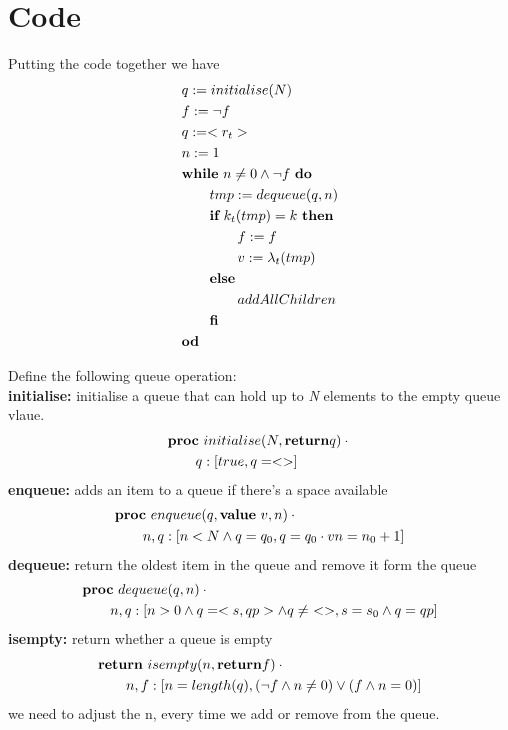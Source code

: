 \documentclass[headings=small,a4paper,12pt]{scrartcl}
\begin{document}
\section{Code}
\label{sec:code}
Putting the code together we have
\begin{align}
    &q\mathrel{:=} initialise(N)\\
    &f\mathrel{:=} \neg f\\
    &q\mathrel{:=} <r_t>\\
    &n\mathrel{:=} 1\\
    &\text{\normalfont\bfseries while}~n \ne 0\wedge \neg f~\text{\normalfont\bfseries do}\\
    &\qquad tmp\mathrel{:=} dequeue(q,n)\\
    &\qquad \text{\normalfont\bfseries if}~k_t(tmp) = k~\text{\normalfont\bfseries then}\\
    &\qquad\qquad f\mathrel{:=} f\\
    &\qquad\qquad v\mathrel{:=} \lambda_t(tmp)\\
    &\qquad \text{\normalfont\bfseries else}\\
    &\qquad\qquad addAllChildren\\
    &\qquad\text{\normalfont\bfseries fi}\\
    &\text{\normalfont\bfseries od}
\end{align}

Define the following queue operation:\\
\textbf{initialise:} initialise a queue that can hold up to \textit{N} elements to the empty queue vlaue.
\begin{align*}
  &\text{\normalfont\bfseries proc}~initialise(N,\text{\normalfont\bfseries return} q)\cdot{}\\
  &\qquad q :[true, q = <>]\\
\end{align*}
\break
\textbf{enqueue:} adds an item to a queue if there's a space available 
\begin{align*}
  &\text{\normalfont\bfseries proc}~enqueue(q, \text{\normalfont\bfseries value}~v,n)\cdot{}\\
    &\qquad n,q:[n<N \wedge q=q_0,q=q_0\cdot{}v n = n_0 + 1]\\
\end{align*}
%
\textbf{dequeue:} return the oldest item in the queue and remove it form the queue\\
\begin{align*}
    &\text{\normalfont\bfseries proc}~dequeue(q, n)\cdot{}\\
    &\qquad n,q:[n>0\wedge q=<s,qp>\wedge q\ne~<>, s= s_0\wedge q = qp] 
\end{align*}
\break
\textbf{isempty:} return whether a queue is empty
\begin{align*}
  &\text{\normalfont\bfseries return}~isempty(n, \text{\normalfont\bfseries return} f)\cdot{}\\
    &\qquad {n,f:[n = length(q) ,(\neg f \wedge n \neq 0)\vee(f \wedge n = 0)]}\\
\end{align*}
\break
we need to adjust the n, every time we add or remove from the queue.\\
\end{document}
